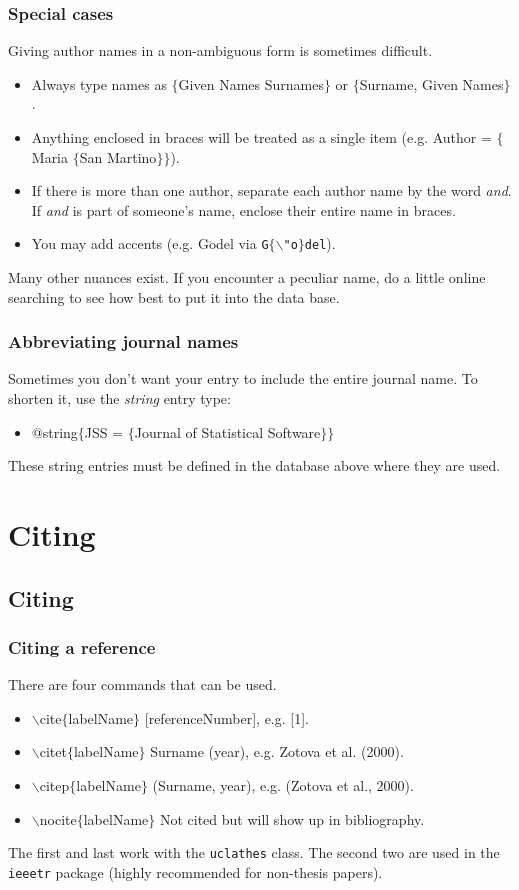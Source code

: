 \begin{frame}  \frametitle{Special cases}
	Giving author names in a non-ambiguous form is sometimes difficult.
	\begin{itemize}
		\item Always type names as $\{$Given Names Surnames$\}$ or $\{$Surname, Given Names$\}$.
		\item Anything enclosed in braces will be treated as a single item (e.g. Author = {\color{braces}$\{${\color{black}Maria} $\{${\color{black}San Martino}$\}\}$}).
		\item If there is more than one author, separate each author name by the word \textit{and}. If \textit{and} is part of someone's name, enclose their entire name in braces.
		\item You may add accents (e.g. G$\ddot{\text{o}}$del via \texttt{G$\{\backslash$"o$\}$del}).
	\end{itemize}
	Many other nuances exist. If you encounter a peculiar name, do a little online searching to see how best to put it into the data base.
\end{frame}

\begin{frame}  \frametitle{Abbreviating journal names}
	Sometimes you don't want your entry to include the entire journal name. To shorten it, use the \textit{string} entry type:
	\begin{itemize}
		\item[] @string$\{$JSS = $\{$Journal of Statistical Software$\}\}$
	\end{itemize}
	These string entries must be defined in the database above where they are used.
\end{frame}


\section{Citing}
\subsection{Citing}

\begin{frame}  \frametitle{Citing a reference}
	There are four commands that can be used.
	\begin{itemize}
		\item {\color{command}$\backslash$cite\color{braces}$\{${\color{black}labelName}$\}$} [referenceNumber], e.g. [1].
		\item {\color{command}$\backslash$citet\color{braces}$\{${\color{black}labelName}$\}$} Surname (year), e.g. Zotova et al. (2000).
		\item {\color{command}$\backslash$citep\color{braces}$\{${\color{black}labelName}$\}$} (Surname, year), e.g. (Zotova et al., 2000).
		\item {\color{command}$\backslash$nocite\color{braces}$\{${\color{black}labelName}$\}$} Not cited but will show up in bibliography.
	\end{itemize}
	The first and last work with the \texttt{\color{highlight}uclathes} class. The second two are used in the \texttt{\color{highlight}ieeetr} package (highly recommended for non-thesis papers).
\end{frame}

